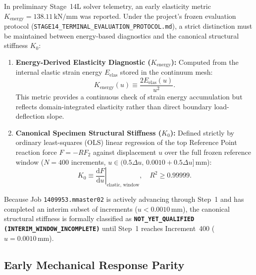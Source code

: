 In preliminary Stage~14L solver telemetry, an early elasticity metric $K_{\mathrm{energy}} = 138.11\,\mathrm{kN/mm}$ was reported. Under the project's frozen evaluation protocol (\texttt{STAGE14\_TERMINAL\_EVALUATION\_PROTOCOL.md}), a strict distinction must be maintained between energy-based diagnostics and the canonical structural stiffness $K_0$:
\begin{enumerate}
    \item \textbf{Energy-Derived Elasticity Diagnostic ($K_{\mathrm{energy}}$):} Computed from the internal elastic strain energy $E_{\mathrm{elas}}$ stored in the continuum mesh:
    \begin{equation}
    \label{eq:k_energy_def}
    K_{\mathrm{energy}}(u) \equiv \frac{2 E_{\mathrm{elas}}(u)}{u^2}.
    \end{equation}
    This metric provides a continuous check of strain energy accumulation but reflects domain-integrated elasticity rather than direct boundary load-deflection slope.
    \item \textbf{Canonical Specimen Structural Stiffness ($K_0$):} Defined strictly by ordinary least-squares (OLS) linear regression of the top Reference Point reaction force $F = -RF_2$ against displacement $u$ over the full frozen reference window ($N=400$ increments, $u \in (0.5\Delta u, \, 0.0010 + 0.5\Delta u]\,\mathrm{mm}$):
    \begin{equation}
    \label{eq:k0_canonical_def}
    K_0 \equiv \left. \frac{\mathrm{d}F}{\mathrm{d}u} \right|_{\mathrm{elastic,\,window}}, \quad R^2 \ge 0.99999.
    \end{equation}
\end{enumerate}
Because Job \texttt{1409953.mmaster02} is actively advancing through Step~1 and has completed an interim subset of increments ($u < 0.0010\,\mathrm{mm}$), the canonical structural stiffness is formally classified as \textbf{\texttt{NOT\_YET\_QUALIFIED (INTERIM\_WINDOW\_INCOMPLETE)}} until Step~1 reaches Increment~400 ($u = 0.0010\,\mathrm{mm}$).

\subsection{Early Mechanical Response Parity}
\label{subsec:stage14m_parity}

